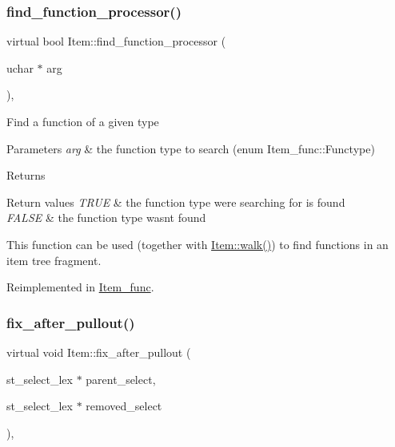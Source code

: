 \subsubsection{\texorpdfstring{find\+\_\+function\+\_\+processor()}{find\_function\_processor()}}
{\footnotesize\ttfamily virtual bool Item\+::find\+\_\+function\+\_\+processor (\begin{DoxyParamCaption}\item[{uchar $\ast$}]{arg }\end{DoxyParamCaption})\hspace{0.3cm}{\ttfamily [inline]}, {\ttfamily [virtual]}}

Find a function of a given type


\begin{DoxyParams}{Parameters}
{\em arg} & the function type to search (enum Item\+\_\+func\+::\+Functype) \\
\hline
\end{DoxyParams}
\begin{DoxyReturn}{Returns}

\end{DoxyReturn}

\begin{DoxyRetVals}{Return values}
{\em T\+R\+UE} & the function type we\textquotesingle{}re searching for is found \\
\hline
{\em F\+A\+L\+SE} & the function type wasn\textquotesingle{}t found\\
\hline
\end{DoxyRetVals}
This function can be used (together with \mbox{\hyperlink{classItem_ab7d2529511c14a77e59a1b1bbabc95d7}{Item\+::walk()}}) to find functions in an item tree fragment. 

Reimplemented in \mbox{\hyperlink{classItem__func_a0aeb033ca165677743782518419b71ac}{Item\+\_\+func}}.

\mbox{\label{classItem_a6e3c38497d210357a4f80a755fb7b61e}} 
\subsubsection{\texorpdfstring{fix\+\_\+after\+\_\+pullout()}{fix\_after\_pullout()}}
{\footnotesize\ttfamily virtual void Item\+::fix\+\_\+after\+\_\+pullout (\begin{DoxyParamCaption}\item[{st\+\_\+select\+\_\+lex $\ast$}]{parent\+\_\+select,  }\item[{st\+\_\+select\+\_\+lex $\ast$}]{removed\+\_\+select }\end{DoxyParamCaption})\hspace{0.3cm}{\ttfamily [inline]}, {\ttfamily [virtual]}}

